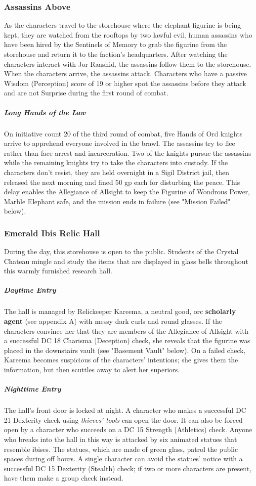 \documentclass[10pt,a4paper,twoside,fancy,bg=print,twocolumn,openany,nodeprecatedcode]{dndbook}
\begin{document}
\subsubsection{Assassins Above}
As the characters travel to the storehouse where the elephant figurine is being kept, they are watched from the rooftops by two lawful evil, human assassins who have been hired by the Sentinels of Memory to grab the figurine from the storehouse and return it to the faction's headquarters. After watching the characters interact with Jor Raashid, the assassins follow them to the storehouse. When the characters arrive, the assassins attack. Characters who have a passive Wisdom (Perception) score of 19 or higher spot the assassins before they attack and are not Surprise during the first round of combat.

\subparagraph{Long Hands of the Law}
On initiative count 20 of the third round of combat, five Hands of Ord knights arrive to apprehend everyone involved in the brawl. The assassins try to flee rather than face arrest and incarceration. Two of the knights pursue the assassins while the remaining knights try to take the characters into custody. If the characters don't resist, they are held overnight in a Sigil District jail, then released the next morning and fined 50 gp each for disturbing the peace. This delay enables the Allegiance of Allsight to keep the Figurine of Wondrous Power, Marble Elephant safe, and the mission ends in failure (see "Mission Failed" below).

\subsubsection{Emerald Ibis Relic Hall}
During the day, this storehouse is open to the public. Students of the Crystal Chateau mingle and study the items that are displayed in glass bells throughout this warmly furnished research hall.

\subparagraph{Daytime Entry}
The hall is managed by Relickeeper Kareema, a neutral good, orc \textbf{scholarly agent} (see appendix A) with messy dark curls and round glasses. If the characters convince her that they are members of the Allegiance of Allsight with a successful DC 18 Charisma (Deception) check, she reveals that the figurine was placed in the downstairs vault (see "Basement Vault" below). On a failed check, Kareema becomes suspicious of the characters' intentions; she gives them the information, but then scuttles away to alert her superiors.

\subparagraph{Nighttime Entry}
The hall's front door is locked at night. A character who makes a successful DC 21 Dexterity check using \textit{thieves' tools} can open the door. It can also be forced open by a character who succeeds on a DC 15 Strength (Athletics) check. Anyone who breaks into the hall in this way is attacked by six animated statues that resemble ibises. The statues, which are made of green glass, patrol the public spaces during off hours. A single character can avoid the statues' notice with a successful DC 15 Dexterity (Stealth) check; if two or more characters are present, have them make a group check instead.
\end{document}
